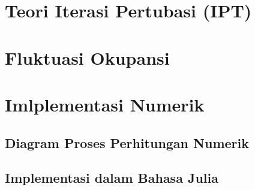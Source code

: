 \section{Teori Iterasi Pertubasi (IPT)}

\section{Fluktuasi Okupansi}

\section{Imlplementasi Numerik}

\subsection{Diagram Proses Perhitungan Numerik}

\subsection{Implementasi dalam Bahasa Julia}


